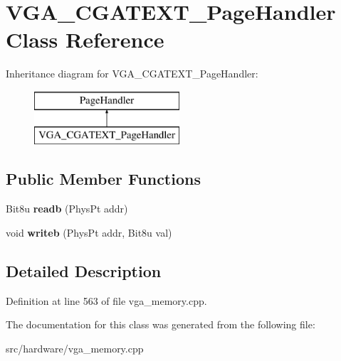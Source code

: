 \hypertarget{classVGA__CGATEXT__PageHandler}{\section{V\-G\-A\-\_\-\-C\-G\-A\-T\-E\-X\-T\-\_\-\-Page\-Handler Class Reference}
\label{classVGA__CGATEXT__PageHandler}
}
Inheritance diagram for V\-G\-A\-\_\-\-C\-G\-A\-T\-E\-X\-T\-\_\-\-Page\-Handler\-:\begin{figure}[H]
\begin{center}
\leavevmode
\includegraphics[height=2.000000cm]{classVGA__CGATEXT__PageHandler}
\end{center}
\end{figure}
\subsection*{Public Member Functions}
\begin{DoxyCompactItemize}
\item 
\hypertarget{classVGA__CGATEXT__PageHandler_a3ae8ae400461447fd27479afa922cc4f}{Bit8u {\bfseries readb} (Phys\-Pt addr)}\label{classVGA__CGATEXT__PageHandler_a3ae8ae400461447fd27479afa922cc4f}

\item 
\hypertarget{classVGA__CGATEXT__PageHandler_a48fb5b9350269a820af9fbaf3a7f30eb}{void {\bfseries writeb} (Phys\-Pt addr, Bit8u val)}\label{classVGA__CGATEXT__PageHandler_a48fb5b9350269a820af9fbaf3a7f30eb}

\end{DoxyCompactItemize}


\subsection{Detailed Description}


Definition at line 563 of file vga\-\_\-memory.\-cpp.



The documentation for this class was generated from the following file\-:\begin{DoxyCompactItemize}
\item 
src/hardware/vga\-\_\-memory.\-cpp\end{DoxyCompactItemize}

